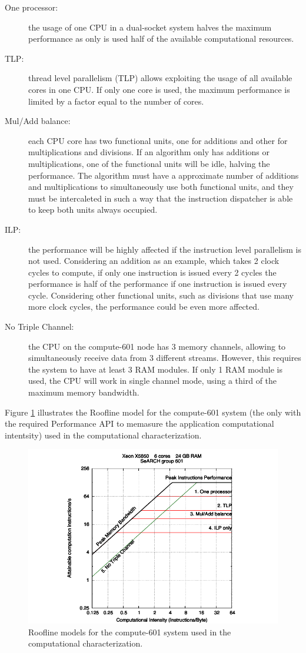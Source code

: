 \begin{description}
	\item[One processor:] the usage of one CPU in a dual-socket system halves the maximum performance as only is used half of the available computational resources.
	\item[TLP:] thread level parallelism (TLP) allows exploiting the usage of all available cores in one CPU. If only one core is used, the maximum performance is limited by a factor equal to the number of cores.
	\item[Mul/Add balance:] each CPU core has two functional units, one for additions and other for multiplications and divisions. If an algorithm only has additions or multiplications, one of the functional units will be idle, halving the performance. The algorithm must have a approximate number of additions and multiplications to simultaneously use both functional units, and they must be intercaleted in such a way that the instruction dispatcher is able to keep both units always occupied.
	\item[ILP:] the performance will be highly affected if the instruction level parallelism is not used. Considering an addition as an example, which takes 2 clock cycles to compute, if only one instruction is issued every 2 cycles the performance is half of the performance if one instruction is issued every cycle. Considering other functional units, such as divisions that use many more clock cycles, the performance could be even more affected.
	\item[No Triple Channel:] the CPU on the compute-601 node has 3 memory channels, allowing to simultaneously receive data from 3 different streams. However, this requires the system to have at least 3 RAM modules. If only 1 RAM module is used, the CPU will work in single channel mode, using a third of the maximum memory bandwidth.
\end{description}

Figure \ref{fig:Roofline601} illustrates the Roofline model for the compute-601 system (the only with the required Performance API to memasure the application computational intentsity) used in the \ttDilepKinFit computational characterization.

\begin{figure}[!htp]
	\begin{center}
		\includegraphics[scale=0.9]{../../common/601.pdf}
		\caption{Roofline models for the compute-601 system used in the \ttDilepKinFit computational characterization.}
		\label{fig:Roofline601}
	\end{center}
\end{figure}

